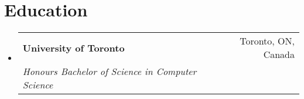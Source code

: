 \documentclass[letterpaper,11pt]{article}
\makeatletter
\newcommand{\resumeSubheading}[4]{
  \vspace{-2pt}\item
    \begin{tabular*}{0.97\textwidth}[t]{l@{\extracolsep{\fill}}r}
      \textbf{#1} & #2 \\
      \textit{\small#3} & \textit{\small #4} \\
    \end{tabular*}\vspace{-7pt}
}
\newcommand{\resumeSubHeadingListStart}{\begin{itemize}[leftmargin=0.15in, label={}]}
\newcommand{\resumeSubHeadingListEnd}{\end{itemize}}
\makeatother
\begin{document}
\section{Education}
  \resumeSubHeadingListStart
    \resumeSubheading
      {University of Toronto}{Toronto, ON, Canada}
      {Honours Bachelor of Science in Computer Science}{}
  \resumeSubHeadingListEnd

\end{document}
